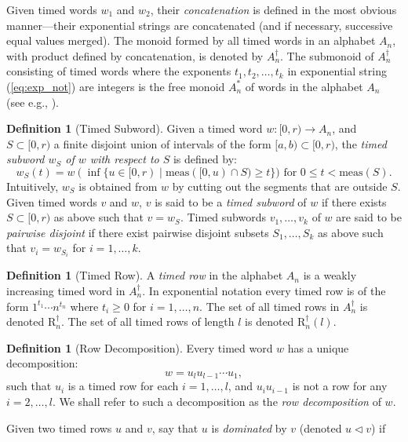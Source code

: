 \documentclass[10pt]{amsproc}
\theoremstyle{definition}
\newtheorem{definition}[theorem]{Definition}
\theoremstyle{remark}
\newcommand{\tr}{\mathrm{R}^\dagger}
\begin{document}
Given timed words $w_1$ and $w_2$, their \emph{concatenation} is defined in the most obvious manner---their exponential strings are concatenated (and if necessary, successive equal values merged).
The monoid formed by all timed words in an alphabet $A_n$, with product defined by concatenation, is denoted by $A_n^\dagger$.
The submonoid of $A_n^\dagger$ consisting of timed words where the exponents $t_1,t_2,\dotsc,t_k$ in exponential string (\ref{eq:exp_not}) are integers is the free monoid $A_n^*$ of words in the alphabet $A_n$ (see e.g., \cite[Chapter~1]{comb-words}).
\begin{definition}
  [Timed Subword]
  \label{definition:timed-subword}
  Given a timed word $w:[0,r)\to A_n$, and $S\subset [0,r)$ a finite disjoint union of intervals of the form $[a, b)\subset [0,r)$, the \emph{timed subword $w_S$ of $w$ with respect to $S$} is defined by:
  \begin{displaymath}
    w_S(t) = w(\inf\{u\in [0,r)\mid \mathrm{meas}([0,u)\cap S) \geq t\}) \text{ for } 0\leq t < \mathrm{meas}(S).
  \end{displaymath}
  Intuitively, $w_S$ is obtained from $w$ by cutting out the segments that are outside $S$.
  Given timed words $v$ and $w$, $v$ is said to be a \emph{timed subword} of $w$ if there exists $S\subset [0,r)$ as above such that $v=w_S$.
  Timed subwords $v_1,\dotsc,v_k$ of $w$ are said to be \emph{pairwise disjoint} if there exist pairwise disjoint subsets $S_1,\dotsc,S_k$ as above such that $v_i=w_{S_i}$ for $i=1,\dotsc,k$.
\end{definition}
\begin{definition}[Timed Row]
A \emph{timed row} in the alphabet $A_n$ is a weakly increasing timed word in $A_n^\dagger$.
In exponential notation every timed row is of the form $1^{t_1}\dotsb n^{t_n}$ where $t_i\geq 0$ for $i=1,\dotsc,n$.
The set of all timed rows in $A_n^\dagger$ is denoted $\tr_n$.
The set of all timed rows of length $l$ is denoted $\tr_n(l)$.
\end{definition}
\begin{definition}[Row Decomposition]
Every timed word $w$ has a unique decomposition:
\begin{displaymath}
  w = u_l u_{l-1}\dotsb u_1,
\end{displaymath}
such that $u_i$ is a timed row for each $i=1,\dotsc,l$, and $u_iu_{i-1}$ is not a row for any $i=2,\dotsc,l$.
We shall refer to such a decomposition as the \emph{row decomposition} of $w$.
\end{definition}
Given two timed rows $u$ and $v$, say that $u$ is \emph{dominated} by $v$ (denoted $u\lhd v$) if
\end{document}
